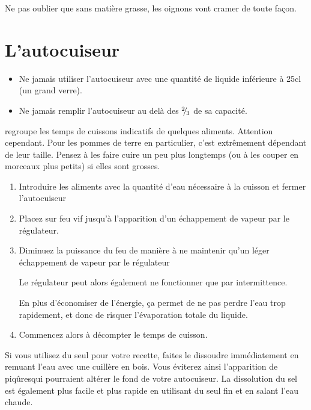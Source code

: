 \documentclass[a4paper,twoside,openright]{report}
\begin{document}
\begin{remarque}
Ne pas oublier que sans matière grasse, les oignons vont cramer de toute façon.
\end{remarque}


\section{L'autocuiseur}
\begin{attention}
\begin{itemize}
\item Ne jamais utiliser l'autocuiseur avec une quantité de liquide inférieure à 25cl (un grand verre).
\item Ne jamais remplir l'autocuiseur au delà des ${{}^{2\!\!}/ _{\!3}}$ de sa capacité.
\end{itemize}
\end{attention}

 regroupe les temps de cuissons indicatifs de quelques aliments. Attention cependant. Pour les pommes de terre en particulier, c'est extrêmement dépendant de leur taille. Pensez à les faire cuire un peu plus longtemps (ou à les couper en morceaux plus petits) si elles sont grosses.

\begin{enumerate}
\item Introduire les aliments avec la quantité d'eau nécessaire à la cuisson et fermer l'autocuiseur
\item Placez sur feu vif jusqu'à l'apparition d'un échappement de vapeur par le régulateur.
\item Diminuez la puissance du feu de manière à ne maintenir qu'un léger échappement de vapeur par le régulateur 
\begin{remarque}
Le régulateur peut alors également ne fonctionner que par intermittence.

En plus d'économiser de l'énergie, ça permet de ne pas perdre l'eau trop rapidement, et donc de risquer l'évaporation totale du liquide.
\end{remarque}
\item Commencez alors à décompter le temps de cuisson.
\end{enumerate}

\begin{remarque}
Si vous utilisez du seul pour votre recette, faites le dissoudre immédiatement en remuant l'eau avec une cuillère en bois. Vous éviterez ainsi l'apparition de \og piqûres\fg qui pourraient altérer le fond de votre autocuiseur. La dissolution du sel est également plus facile et plus rapide en utilisant du seul fin et en salant l'eau chaude.
\end{remarque}
\end{document}
